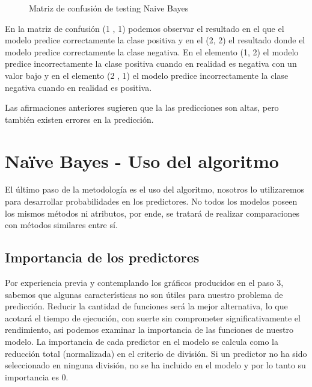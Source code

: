 \begin{center}
    	\begin{figure}[htb]
	\centering
	\caption{Matriz de confusión de testing Naive Bayes}
	\label{fig:mctnb}
	\end{figure}
\end{center}
    
    En la matriz de confusión (1 , 1) podemos observar el resultado en el
que el modelo predice correctamente la clase positiva y en el (2, 2) el
resultado donde el modelo predice correctamente la clase negativa. En el
elemento (1, 2) el modelo predice incorrectamente la clase positiva
cuando en realidad es negativa con un valor bajo y en el elemento (2 ,
1) el modelo predice incorrectamente la clase negativa cuando en
realidad es positiva.

Las afirmaciones anteriores sugieren que la las predicciones son altas,
pero también existen errores en la predicción.

    \hypertarget{nauxefve-bayes---uso-del-algoritmo}{%
\section{Naïve Bayes - Uso del
algoritmo}\label{nauxefve-bayes---uso-del-algoritmo}}

El último paso de la metodología es el uso del algoritmo, nosotros lo
utilizaremos para desarrollar probabilidades en los predictores. No
todos los modelos poseen los mismos métodos ni atributos, por ende, se
tratará de realizar comparaciones con métodos similares entre sí.

    \hypertarget{importancia-de-los-predictores}{%
\subsection{Importancia de los
predictores}\label{importancia-de-los-predictores}}

Por experiencia previa y contemplando los gráficos producidos en el paso
3, sabemos que algunas características no son útiles para nuestro
problema de predicción. Reducir la cantidad de funciones será la mejor
alternativa, lo que acotará el tiempo de ejecución, con suerte sin
comprometer significativamente el rendimiento, asi podemos examinar la
importancia de las funciones de nuestro modelo. La importancia de cada
predictor en el modelo se calcula como la reducción total (normalizada)
en el criterio de división. Si un predictor no ha sido seleccionado en
ninguna división, no se ha incluido en el modelo y por lo tanto su
importancia es 0.

